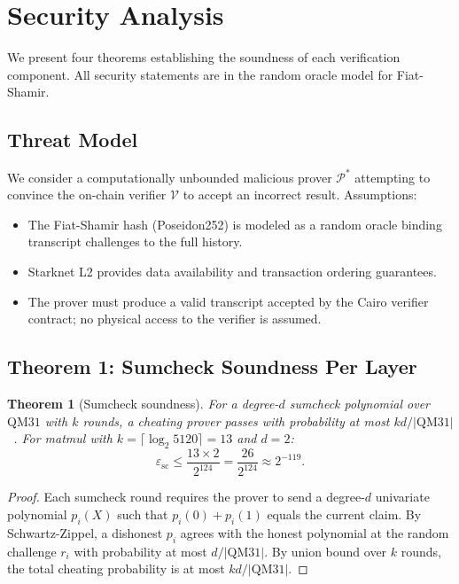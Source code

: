 \documentclass[10pt,twocolumn]{article}
\newtheorem{theorem}{Theorem}[section]
\theoremstyle{definition}
\theoremstyle{remark}
\newcommand{\QM}{\mathrm{QM31}}
\newcommand{\calP}{\mathcal{P}}
\newcommand{\calV}{\mathcal{V}}
\begin{document}
\section{Security Analysis}\label{sec:security}

We present four theorems establishing the soundness of each
verification component. All security statements are in the
random oracle model for Fiat-Shamir.

\subsection{Threat Model}

We consider a computationally unbounded malicious prover $\calP^*$
attempting to convince the on-chain verifier $\calV$ to accept an
incorrect result.
Assumptions:
\begin{itemize}[nosep,leftmargin=1.2em]
  \item The Fiat-Shamir hash (Poseidon252) is modeled as a random
        oracle binding transcript challenges to the full history.
  \item Starknet L2 provides data availability and transaction
        ordering guarantees.
  \item The prover must produce a valid transcript accepted by the
        Cairo verifier contract; no physical access to the verifier
        is assumed.
\end{itemize}

\subsection{Theorem 1: Sumcheck Soundness Per Layer}

\begin{theorem}[Sumcheck soundness]\label{thm:sumcheck}
  For a degree-$d$ sumcheck polynomial over $\QM$ with $k$ rounds,
  a cheating prover passes with probability at most
  $kd/|\QM|$~\cite{lund1992algebraic, schwartz1980, zippel1979}.
  For matmul with $k=\lceil\log_2 5120\rceil = 13$ and $d=2$:
  \[
    \varepsilon_{\text{sc}} \le \frac{13\times 2}{2^{124}}
    = \frac{26}{2^{124}} \approx 2^{-119}.
  \]
\end{theorem}

\begin{proof}
  Each sumcheck round requires the prover to send a degree-$d$
  univariate polynomial $p_i(X)$ such that $p_i(0)+p_i(1)$ equals
  the current claim.
  By Schwartz-Zippel, a dishonest $p_i$ agrees with the honest
  polynomial at the random challenge $r_i$ with probability at
  most $d/|\QM|$.
  By union bound over $k$ rounds, the total cheating probability
  is at most $kd/|\QM|$.
\end{proof}
\end{document}
